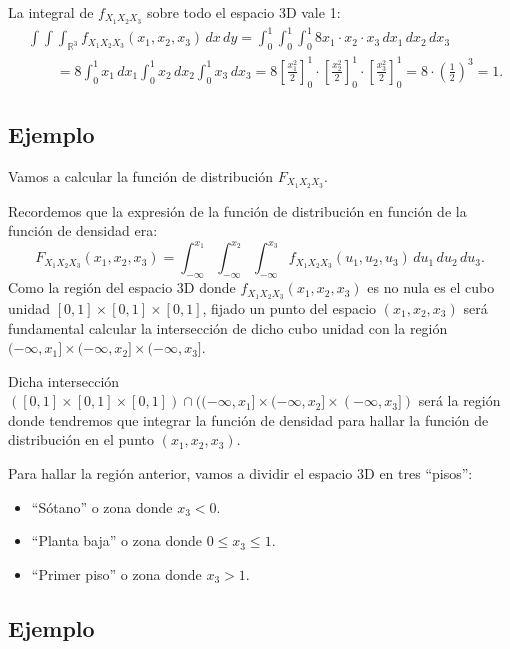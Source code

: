 \documentclass[]{book}
\providecommand{\tightlist}{%
  \setlength{\itemsep}{0pt}\setlength{\parskip}{0pt}}
\begin{document}
La integral de \(f_{X_1X_2X_3}\) sobre todo el espacio 3D vale 1:
\[
\begin{array}{rl}
& \int\int\int_{\mathbb{R}^3} f_{X_1X_2X_3}(x_1,x_2,x_3)\,dx\, dy=\int_0^1\int_0^1\int_0^1 8 x_1\cdot x_2\cdot x_3\, dx_1\,dx_2\,dx_3\\ & \qquad=8\int_0^1 x_1\, dx_1\int_0^1 x_2\, dx_2\int_0^1 x_3\,dx_3=8\left[\frac{x_1^2}{2}\right]_0^1\cdot\left[\frac{x_2^2}{2}\right]_0^1\cdot \left[\frac{x_3^2}{2}\right]_0^1=8\cdot\left(\frac{1}{2}\right)^3 =1.
\end{array}
\]

\hypertarget{ejemplo-100}{%
\subsection{Ejemplo}\label{ejemplo-100}}

Vamos a calcular la función de distribución \(F_{X_1X_2X_3}\).

Recordemos que la expresión de la función de distribución en función de la función de densidad era:
\[
F_{X_1X_2X_3}(x_1,x_2,x_3)=\int_{-\infty}^{x_1}\int_{-\infty}^{x_2}\int_{-\infty}^{x_3}f_{X_1X_2X_3}(u_1,u_2,u_3)\,du_1\, du_2\, du_3.
\]
Como la región del espacio 3D donde \(f_{X_1X_2X_3}(x_1,x_2,x_3)\) es no nula es el cubo unidad \([0,1]\times [0,1]\times [0,1]\), fijado un punto del espacio \((x_1,x_2,x_3)\) será fundamental calcular la intersección de dicho cubo unidad con la región \((-\infty,x_1]\times (-\infty,x_2]\times (-\infty,x_3]\).

Dicha intersección \(([0,1]\times [0,1]\times [0,1])\cap ((-\infty,x_1]\times (-\infty,x_2]\times (-\infty,x_3])\) será la región donde tendremos que integrar la función de densidad para hallar la función de distribución en el punto \((x_1,x_2,x_3)\).

Para hallar la región anterior, vamos a dividir el espacio 3D en tres ``pisos'':

\begin{itemize}
\tightlist
\item
  ``Sótano'' o zona donde \(x_3<0\).
\item
  ``Planta baja'' o zona donde \(0\leq x_3\leq 1\).
\item
  ``Primer piso'' o zona donde \(x_3>1\).
\end{itemize}

\hypertarget{ejemplo-101}{%
\subsection{Ejemplo}\label{ejemplo-101}}
\end{document}
